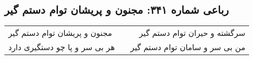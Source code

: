 \begin{center}
\section*{رباعی شماره ۳۴۱: مجنون و پریشان توام دستم گیر}
\label{sec:sh341}
\begin{longtable}{l p{0.5cm} r}
مجنون و پریشان توام دستم گیر
&&
سرگشته و حیران توام دستم گیر
\\
هر بی سر و پا چو دستگیری دارد
&&
من بی سر و سامان توام دستم گیر
\\
\end{longtable}
\end{center}
